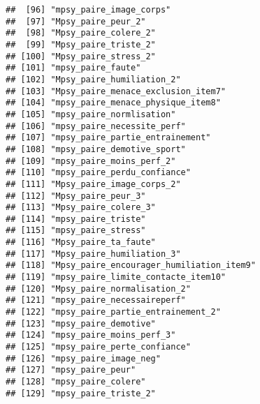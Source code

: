 \documentclass[
]{article}
\begin{document}
\begin{verbatim}
##  [96] "mpsy_paire_image_corps"                                            
##  [97] "Mpsy_paire_peur_2"                                                 
##  [98] "Mpsy_paire_colere_2"                                               
##  [99] "Mpsy_paire_triste_2"                                               
## [100] "Mpsy_paire_stress_2"                                               
## [101] "mpsy_paire_faute"                                                  
## [102] "Mpsy_paire_humiliation_2"                                          
## [103] "Mpsy_paire_menace_exclusion_item7"                                 
## [104] "mpsy_paire_menace_physique_item8"                                  
## [105] "mpsy_paire_normlisation"                                           
## [106] "mpsy_paire_necessite_perf"                                         
## [107] "mpsy_paire_partie_entrainement"                                    
## [108] "mpsy_paire_demotive_sport"                                         
## [109] "mpsy_paire_moins_perf_2"                                           
## [110] "mpsy_paire_perdu_confiance"                                        
## [111] "Mpsy_paire_image_corps_2"                                          
## [112] "Mpsy_paire_peur_3"                                                 
## [113] "Mpsy_paire_colere_3"                                               
## [114] "mpsy_paire_triste"                                                 
## [115] "mpsy_paire_stress"                                                 
## [116] "Mpsy_paire_ta_faute"                                               
## [117] "Mpsy_paire_humiliation_3"                                          
## [118] "Mpsy_paire_encourager_humiliation_item9"                           
## [119] "mpsy_paire_limite_contacte_item10"                                 
## [120] "Mpsy_paire_normalisation_2"                                        
## [121] "mpsy_paire_necessaireperf"                                         
## [122] "mpsy_paire_partie_entrainement_2"                                  
## [123] "mpsy_paire_demotive"                                               
## [124] "mpsy_paire_moins_perf_3"                                           
## [125] "mpsy_paire_perte_confiance"                                        
## [126] "mpsy_paire_image_neg"                                              
## [127] "mpsy_paire_peur"                                                   
## [128] "mpsy_paire_colere"                                                 
## [129] "mpsy_paire_triste_2"                                               

\end{verbatim}
\end{document}
